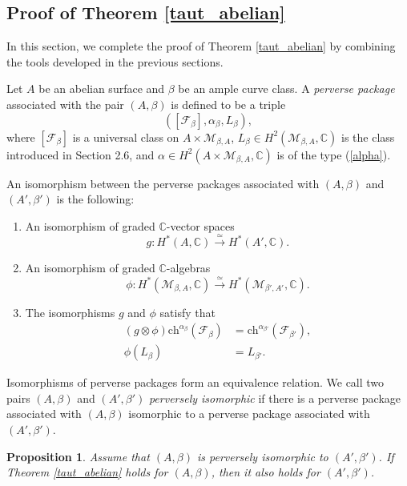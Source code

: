\documentclass[11pt]{amsart}
\theoremstyle{plain}
\newtheorem{prop}[thm]{Proposition}
\theoremstyle{definition}
\theoremstyle{remark}
\newcommand{\BC}{{\mathbb{C}}}
\newcommand{\CF}{{\mathcal F}}
\newcommand{\CM}{{\mathcal M}}
\begin{document}
\subsection{Proof of Theorem \ref{taut_abelian}}\label{Section2.7} In this section, we complete the proof of Theorem \ref{taut_abelian} by combining the tools developed in the previous sections.

Let $A$ be an abelian surface and $\beta$ be an ample curve class. A \emph{perverse package} associated with the pair $(A, \beta)$ is defined to be a triple
\[
 ([\CF_\beta], \alpha_\beta, L_\beta),
\]
where $[\CF_\beta]$ is a universal class on $A \times \CM_{\beta,A}$, $L_\beta \in H^2(\CM_{\beta,A}, \BC)$ is the class introduced in Section 2.6, and $\alpha \in H^2(A\times \CM_{\beta,A}, \BC)$ is of the type (\ref{alpha}).

An isomorphism between the perverse packages associated with $(A, \beta)$ and $(A', \beta')$ is the following:
\begin{enumerate}
    \item[(i)] An  isomorphism of  graded $\BC$-vector spaces 
    \[
    g: H^*(A, \BC) \xrightarrow{\simeq} H^*(A', \BC).
    \]
    \item[(ii)] An isomorphism of graded  $\BC$-algebras
    \[
    \phi: H^*(\CM_{\beta,A}, \BC) \xrightarrow{\simeq} H^*(\CM_{\beta',A'}, \BC).
    \]
    \item[(iii)] The isomorphisms $g$ and $\phi$ satisfy that
    \[
    \begin{split}
        (g\otimes \phi) \mathrm{ch}^{\alpha_\beta} (\CF_\beta) & = \mathrm{ch}^{\alpha_{\beta'}}(\CF_{\beta'}),\\
        \phi(L_\beta) & = L_{\beta'}.
    \end{split}
    \]
\end{enumerate}
Isomorphisms of perverse packages form an equivalence relation. We call two pairs $(A, \beta)$ and $(A', \beta')$ \emph{perversely isomorphic} if there is a perverse package associated with $(A,\beta)$ isomorphic to a perverse package associated with $(A', \beta')$.

\begin{prop}\label{prop2.5}
Assume that $(A, \beta)$ is perversely isomorphic to $(A', \beta')$. If Theorem \ref{taut_abelian} holds for $(A, \beta)$, then it also holds for $(A', \beta')$.
\end{prop}
\end{document}
